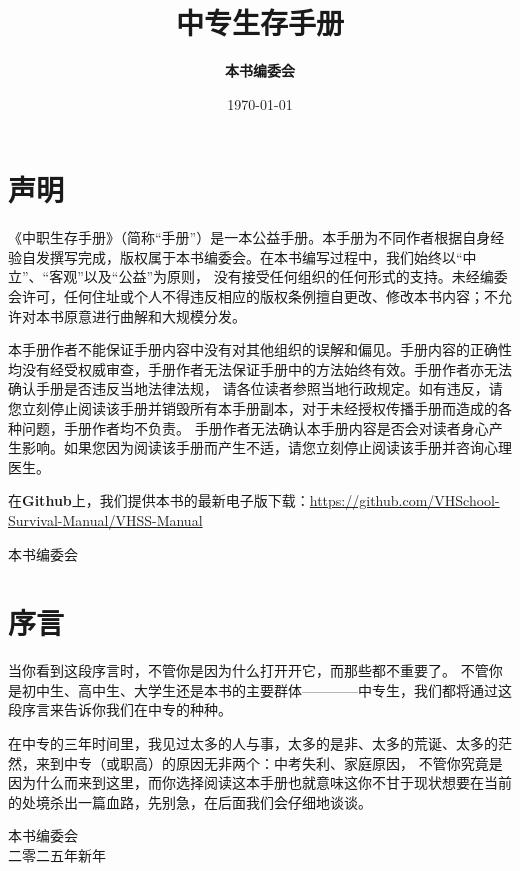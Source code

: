 \documentclass{article}
\begin{document}
\title{\textbf{中专生存手册}}
\author{\textbf{本书编委会}}
\date{\today{}}

\maketitle
\thispagestyle{empty}
\newpage

\section{声明}

《中职生存手册》（简称“手册”）是一本公益手册。本手册为不同作者根据自身经验自发撰写完成，版权属于本书编委会。在本书编写过程中，我们始终以“中立”、“客观”以及“公益”为原则，
没有接受任何组织的任何形式的支持。未经编委会许可，任何住址或个人不得违反相应的版权条例擅自更改、修改本书内容；不允许对本书原意进行曲解和大规模分发。

本手册作者不能保证手册内容中没有对其他组织的误解和偏见。手册内容的正确性均没有经受权威审查，手册作者无法保证手册中的方法始终有效。手册作者亦无法确认手册是否违反当地法律法规，
请各位读者参照当地行政规定。如有违反，请您立刻停止阅读该手册并销毁所有本手册副本，对于未经授权传播手册而造成的各种问题，手册作者均不负责。
手册作者无法确认本手册内容是否会对读者身心产生影响。如果您因为阅读该手册而产生不适，请您立刻停止阅读该手册并咨询心理医生。

在\textbf{Github}上，我们提供本书的最新电子版下载：\href{VHSS-Manual}{https://github.com/VHSchool-Survival-Manual/VHSS-Manual}

\begin{flushright}
本书编委会
\end{flushright}
\newpage

\section{序言}

当你看到这段序言时，不管你是因为什么打开开它，而那些都不重要了。
不管你是初中生、高中生、大学生还是本书的主要群体————中专生，我们都将通过这段序言来告诉你我们在中专的种种。

在中专的三年时间里，我见过太多的人与事，太多的是非、太多的荒诞、太多的茫然，来到中专（或职高）的原因无非两个：中考失利、家庭原因，
不管你究竟是因为什么而来到这里，而你选择阅读这本手册也就意味这你不甘于现状想要在当前的处境杀出一篇血路，先别急，在后面我们会仔细地谈谈。

\begin{flushright}
本书编委会 \\ 二零二五年新年
\end{flushright}

\newpage
\tableofcontents


\end{document}
